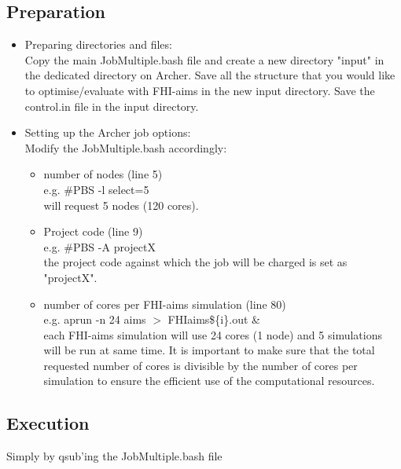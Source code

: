 \documentclass[12pt]{article}
\begin{document}
\subsection{Preparation}
\begin{itemize}
  \item Preparing directories and files: \\
  Copy the main JobMultiple.bash file and create a new directory "input" in the dedicated directory on Archer. 
  Save all the structure that you would like to optimise/evaluate with FHI-aims in the new input directory. 
  Save the control.in file in the input directory.
  
  \item Setting up the Archer job options: \\
  Modify the JobMultiple.bash accordingly:
  
  \begin{itemize}
  
  \item number of nodes (line 5) \\
  e.g. \#PBS -l select=5 \\
  will request 5 nodes (120 cores).
  
  \item Project code (line 9) \\
  e.g. \#PBS -A projectX
  \\ the project code against which the job will be charged is set as "projectX".
  
  \item number of cores per FHI-aims simulation (line 80) \\
  e.g. aprun -n 24 aims $>$ FHIaims\$\{i\}.out \&
  \\  each FHI-aims simulation will use 24 cores (1 node) and 5 simulations will be run at same time. It is important to make sure that the total requested number of cores is divisible by the number of cores per simulation to ensure the efficient use of the computational resources.
  
  \end{itemize}
\end{itemize}

\subsection{Execution}

Simply by qsub'ing the JobMultiple.bash file
\end{document}
